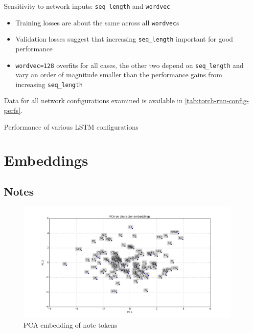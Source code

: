 Sensitivity to network inputs: \texttt{seq\_length} and \texttt{wordvec}
\begin{itemize}
    \item Training losses are about the same across all \texttt{wordvec}s
    \item Validation losses suggest that increasing \texttt{seq\_length} important for
        good performance 
    \item \texttt{wordvec=128} overfits for all cases, the other two depend on
        \texttt{seq\_length} and vary an order of magnitude smaller than the
        performance gains from increasing \texttt{seq\_length}
\end{itemize}

Data for all network configurations examined is available in \autoref{tab:torch-rnn-config-perfs}.

\begin{table}[htpb]
    \centering
    \caption{Performance of various LSTM configurations}
    \label{tab:torch-rnn-config-perfs}
    
\end{table}

\section{Embeddings}

\subsection{Notes}

\begin{figure}[htpb]
    \centering
    \includegraphics[width=0.8\linewidth]{Figures/PCA-notes.png}
    \caption{PCA embedding of note tokens}
    \label{fig:pca-notes}
\end{figure}

